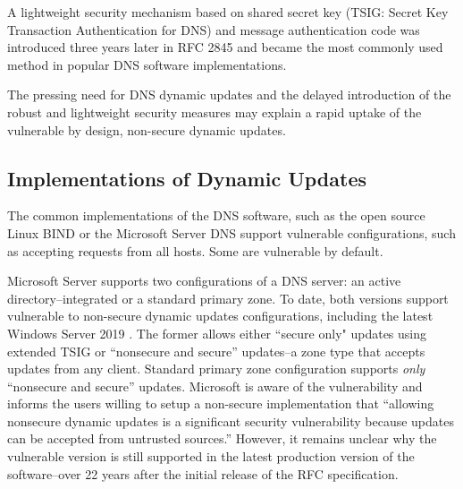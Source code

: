 A lightweight security mechanism based on shared secret key (TSIG: Secret Key Transaction Authentication for DNS) and message authentication code was introduced three years later in RFC 2845 \cite{rfc2845} and became the most commonly used method in popular DNS software implementations.
%

The pressing need for DNS dynamic updates and the delayed introduction of the robust and lightweight security measures may explain a rapid uptake of the vulnerable by design, non-secure dynamic updates.



\subsection{Implementations of Dynamic Updates}

The common implementations of the DNS software, such as the open source Linux BIND \cite{bind} or the Microsoft Server DNS \cite{micro3} support vulnerable configurations, such as accepting requests from all hosts.
Some are vulnerable by default.

Microsoft Server supports two configurations of a DNS server: an active directory--integrated or a standard primary zone.
To date, both versions support vulnerable to %
non-secure dynamic updates configurations, including the latest Windows Server 2019 \cite{step}.
The former allows either ``secure only" updates using extended TSIG or ``nonsecure and secure'' updates--a zone type that accepts updates from any client. %
Standard primary zone configuration supports \textit{only} ``nonsecure and secure''  updates.
Microsoft is aware of the vulnerability and informs the users willing to setup a non-secure implementation that ``allowing nonsecure dynamic updates is a significant security vulnerability because updates can be accepted from untrusted sources.''
However, it remains unclear why the vulnerable version is still supported in the latest production version of the software--over 22 years after the initial release of the RFC specification.

